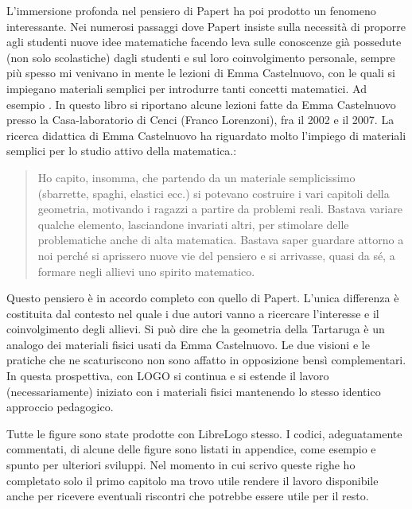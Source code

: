 L'immersione profonda nel pensiero di Papert ha poi prodotto un fenomeno interessante. Nei
numerosi passaggi dove Papert insiste sulla necessità di proporre agli studenti nuove idee
matematiche facendo leva sulle conoscenze già possedute (non solo scolastiche) dagli studenti e sul loro coinvolgimento personale, sempre più spesso mi venivano in mente le lezioni di Emma
Castelnuovo, con le quali si impiegano materiali semplici per introdurre tanti concetti matematici. Ad esempio \cite{Castelnuovo}. In questo
libro si riportano alcune lezioni fatte da Emma Castelnuovo presso la Casa-laboratorio di Cenci (Franco Lorenzoni), fra il 2002 e il 2007. La ricerca didattica di Emma Castelnuovo ha riguardato molto l'impiego di materiali semplici per lo studio attivo della matematica.:

\begin{quote}
Ho capito, insomma, che partendo da un materiale semplicissimo (sbarrette, spaghi, elastici ecc.) si potevano costruire i vari capitoli della geometria, motivando i ragazzi a partire da problemi reali. Bastava variare qualche elemento, lasciandone invariati altri, per stimolare delle problematiche anche di alta matematica. Bastava saper guardare attorno a noi perché si aprissero nuove vie del pensiero e si arrivasse, quasi da sé, a formare negli allievi uno spirito matematico.
\end{quote}

Questo pensiero è in accordo completo con quello di Papert. L'unica differenza è costituita dal
contesto nel quale i due autori vanno a ricercare l'interesse e il coinvolgimento degli allievi. Si può dire che la geometria della Tartaruga è un analogo dei materiali fisici usati da Emma Castelnuovo.
Le due visioni e le pratiche che ne scaturiscono non sono affatto in opposizione bensì
complementari. In questa prospettiva, con LOGO si continua e si estende il lavoro
(necessariamente) iniziato con i materiali fisici mantenendo lo stesso identico approccio
pedagogico.

Tutte le figure sono state prodotte con LibreLogo stesso. I codici, adeguatamente commentati, di alcune delle figure sono listati in appendice, come esempio e spunto per ulteriori sviluppi. Nel momento in cui scrivo queste righe ho completato solo il primo capitolo ma trovo utile rendere il lavoro disponibile anche per ricevere eventuali riscontri che potrebbe essere utile per il resto.




